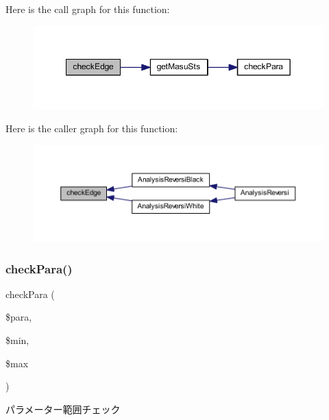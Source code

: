 Here is the call graph for this function\+:
\nopagebreak
\begin{figure}[H]
\begin{center}
\leavevmode
\includegraphics[width=349pt]{class_reversi_acd2c64ea43cc26407ad64920a183446b_cgraph}
\end{center}
\end{figure}
Here is the caller graph for this function\+:
\nopagebreak
\begin{figure}[H]
\begin{center}
\leavevmode
\includegraphics[width=350pt]{class_reversi_acd2c64ea43cc26407ad64920a183446b_icgraph}
\end{center}
\end{figure}
\mbox{\label{class_reversi_ac8d57b64bc839c8bb1f53a2a5db11228}} 
\subsubsection{\texorpdfstring{check\+Para()}{checkPara()}}
{\footnotesize\ttfamily check\+Para (\begin{DoxyParamCaption}\item[{}]{\$para,  }\item[{}]{\$min,  }\item[{}]{\$max }\end{DoxyParamCaption})\hspace{0.3cm}{\ttfamily [private]}}



パラメーター範囲チェック 


